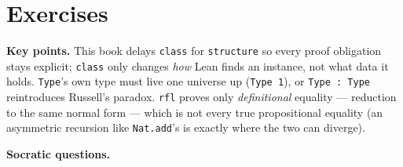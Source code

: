 \section{Exercises}\label{sec:05-rigor-check:05-exercises:1}

\textbf{Key points.} This book delays \texttt{class} for \texttt{structure} so every proof obligation stays explicit; \texttt{class} only changes \emph{how} Lean finds an instance, not what data it holds. \texttt{Type}'s own type must live one universe up (\texttt{Type 1}), or \texttt{Type : Type} reintroduces Russell's paradox. \texttt{rfl} proves only \emph{definitional} equality --- reduction to the same normal form --- which is not every true propositional equality (an asymmetric recursion like \texttt{Nat.add}'s is exactly where the two can diverge).

\textbf{Socratic questions.}

